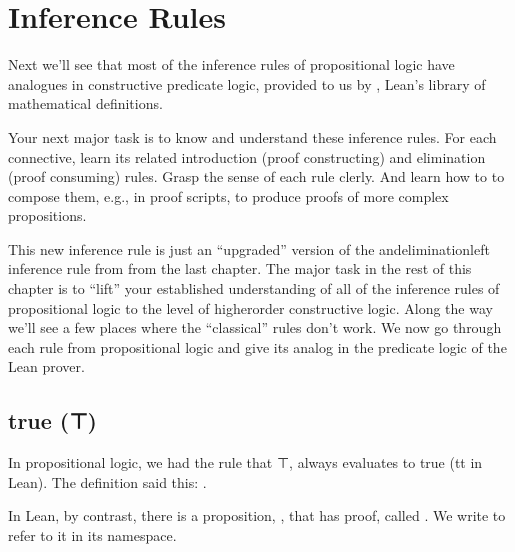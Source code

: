 \documentclass[letterpaper,10pt,english]{sphinxmanual}
\begin{document}
\section{Inference Rules}
\label{\detokenize{A_02_Constructive_Logic:inference-rules}}
\sphinxAtStartPar
Next we’ll see that most of the inference rules
of propositional logic have analogues in constructive
predicate logic, provided to us by , Lean’s
library of mathematical definitions.

\sphinxAtStartPar
Your next major task is to know and understand these
inference rules. For each connective, learn its related
introduction (proof constructing) and elimination (proof
consuming) rules. Grasp the sense of each rule clerly.
And learn how to to compose them, e.g., in proof scripts,
to produce proofs of more complex propositions.

\sphinxAtStartPar
This new inference rule is just an “upgraded”
version of the and\sphinxhyphen{}elimination\sphinxhyphen{}left inference rule from
from the last chapter. The major task in the rest of this
chapter is to “lift” your established understanding of all
of the inference rules of propositional logic to the level
of higher\sphinxhyphen{}order constructive logic. Along the way we’ll see
a few places where the “classical” rules don’t work.
We now go through each rule from propositional logic and
give its analog in the predicate logic of the Lean prover.


\subsection{true (⊤)}
\label{\detokenize{A_02_Constructive_Logic:true}}
\sphinxAtStartPar
In propositional logic, we had the rule that ⊤, always
evaluates to true (tt in Lean). The definition said this:
.

\sphinxAtStartPar
In Lean, by contrast, there is a proposition, , that
has proof, called . We write  to refer
to it in its namespace.

\begin{sphinxVerbatim}[commandchars=\\\{\}]
                    
      
\end{sphinxVerbatim}
\end{document}
